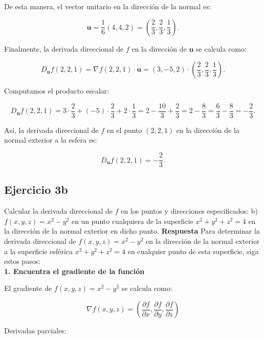 \documentclass{report}
\begin{document}
    De esta manera, el vector unitario en la dirección de la normal es:

    \[
    \mathbf{u} = \frac{1}{6} (4, 4, 2) = \left( \frac{2}{3}, \frac{2}{3}, \frac{1}{3} \right).
    \]

    Finalmente, la derivada direccional de \( f \) en la dirección de \( \mathbf{u} \) se calcula como:

    \[
    D_{\mathbf{u}} f(2, 2, 1) = \nabla f(2, 2, 1) \cdot \mathbf{u} = (3, -5, 2) \cdot \left( \frac{2}{3}, \frac{2}{3}, \frac{1}{3} \right).
    \]

    Computamos el producto escalar:

    \[
    D_{\mathbf{u}} f(2, 2, 1) = 3 \cdot \frac{2}{3} + (-5) \cdot \frac{2}{3} + 2 \cdot \frac{1}{3} = 2 - \frac{10}{3} + \frac{2}{3} = 2 - \frac{8}{3} = \frac{6}{3} - \frac{8}{3} = -\frac{2}{3}.
    \]

    Así, la derivada direccional de \( f \) en el punto \( (2, 2, 1) \) en la dirección de la normal exterior a la esfera es:

    \[
    D_{\mathbf{u}} f(2, 2, 1) = -\frac{2}{3}.
    \]                    \subsection*{Ejercicio 3b}
                        Calcular la derivada direccional de \(f\) en los puntos y direcciones especificados:
                        b) \(f(x, y, z) = x^2 - y^2\) en un punto cualquiera de la superficie \(x^2 + y^2 + z^2 = 4\) en la dirección de la normal exterior en dicho punto.
                        \textbf{Respuesta}
                        Para determinar la derivada direccional de \( f(x, y, z) = x^2 - y^2 \) en la dirección de la normal exterior a la superficie esférica \( x^2 + y^2 + z^2 = 4 \) en cualquier punto de esta superficie, siga estos pasos:
                        \\
                        \textbf{1. Encuentra el gradiente de la función}
                        
                        El gradiente de \( f(x, y, z) = x^2 - y^2 \) se calcula como:
                        
                        \[
                        \nabla f(x, y, z) = \left( \frac{\partial f}{\partial x}, \frac{\partial f}{\partial y}, \frac{\partial f}{\partial z} \right)
                        \]
                        
                        Derivadas parciales:
                        
\end{document}
